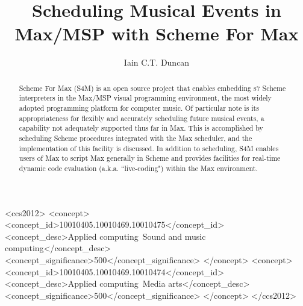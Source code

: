 \documentclass[acmsmall]{acmart}
\begin{document}
\title{Scheduling Musical Events in Max/MSP with Scheme For Max}

\author{Iain C.T. Duncan}


\renewcommand{\shortauthors}{Duncan}

\begin{abstract}
Scheme For Max (S4M) is an open source project that enables embedding 
s7 Scheme interpreters in the Max/MSP visual programming environment,
the most widely adopted programming platform for computer music.
Of particular note is its appropriateness for flexibly
and accurately scheduling future musical events, a capability not
adequately supported thus far in Max. This is accomplished by scheduling
Scheme procedures integrated with the Max scheduler, and the 
implementation of this facility is discussed.
In addition to scheduling, S4M enables users of Max to script Max 
generally in Scheme and provides facilities for 
real-time dynamic code evaluation (a.k.a. ``live-coding") within the
Max environment. 

\end{abstract}


\begin{CCSXML}
<ccs2012>
<concept>
<concept_id>10010405.10010469.10010475</concept_id>
<concept_desc>Applied computing~Sound and music computing</concept_desc>
<concept_significance>500</concept_significance>
</concept>
<concept>
<concept_id>10010405.10010469.10010474</concept_id>
<concept_desc>Applied computing~Media arts</concept_desc>
<concept_significance>500</concept_significance>
</concept>
</ccs2012>
\end{CCSXML}
\end{document}
